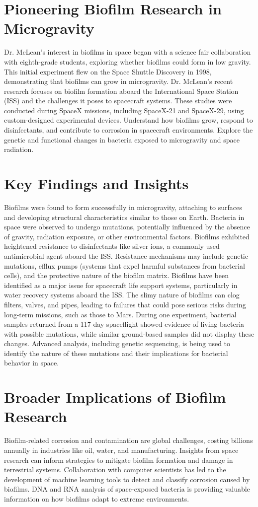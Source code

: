 \documentclass[12pt]{article}
\begin{document}
\section{Pioneering Biofilm Research in Microgravity}
    Dr. McLean’s interest in biofilms in space began with a science fair collaboration with eighth-grade students, exploring whether biofilms could form in low gravity. This initial experiment flew on the Space Shuttle Discovery in 1998, demonstrating that biofilms can grow in microgravity. Dr. McLean’s recent research focuses on biofilm formation aboard the International Space Station (ISS) and the challenges it poses to spacecraft systems. These studies were conducted during SpaceX missions, including SpaceX-21 and SpaceX-29, using custom-designed experimental devices. Understand how biofilms grow, respond to disinfectants, and contribute to corrosion in spacecraft environments. Explore the genetic and functional changes in bacteria exposed to microgravity and space radiation.

\section{Key Findings and Insights}
    Biofilms were found to form successfully in microgravity, attaching to surfaces and developing structural characteristics similar to those on Earth. Bacteria in space were observed to undergo mutations, potentially influenced by the absence of gravity, radiation exposure, or other environmental factors. Biofilms exhibited heightened resistance to disinfectants like silver ions, a commonly used antimicrobial agent aboard the ISS. Resistance mechanisms may include genetic mutations, efflux pumps (systems that expel harmful substances from bacterial cells), and the protective nature of the biofilm matrix. Biofilms have been identified as a major issue for spacecraft life support systems, particularly in water recovery systems aboard the ISS. The slimy nature of biofilms can clog filters, valves, and pipes, leading to failures that could pose serious risks during long-term missions, such as those to Mars. During one experiment, bacterial samples returned from a 117-day spaceflight showed evidence of living bacteria with possible mutations, while similar ground-based samples did not display these changes. Advanced analysis, including genetic sequencing, is being used to identify the nature of these mutations and their implications for bacterial behavior in space.


\section{Broader Implications of Biofilm Research}
    Biofilm-related corrosion and contamination are global challenges, costing billions annually in industries like oil, water, and manufacturing. Insights from space research can inform strategies to mitigate biofilm formation and damage in terrestrial systems. Collaboration with computer scientists has led to the development of machine learning tools to detect and classify corrosion caused by biofilms. DNA and RNA analysis of space-exposed bacteria is providing valuable information on how biofilms adapt to extreme environments.
\end{document}
